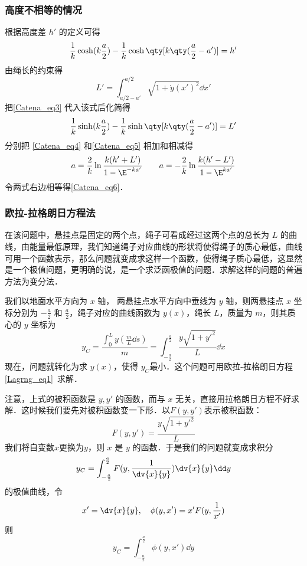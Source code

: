 \subsubsection{高度不相等的情况}
根据高度差 $h'$ 的定义可得
\begin{equation}\label{Catena_eq4}
\frac{1}{k}\cosh(k\frac{a}{2}) - \frac{1}{k}\cosh\qty[k\qty(\frac{a}{2}-a')] = h'
\end{equation}
由绳长的约束得
\begin{equation}
L' = \int_{a/2-a'}^{a/2} \sqrt{1 + \dot y(x')^2} \dd{x'}
\end{equation}
把\autoref{Catena_eq3} 代入该式后化简得
\begin{equation}\label{Catena_eq5}
\frac{1}{k}\sinh(k\frac{a}{2}) - \frac{1}{k}\sinh\qty[k\qty(\frac{a}{2}-a')] = L'
\end{equation}
分别把 \autoref{Catena_eq4} 和\autoref{Catena_eq5} 相加和相减得
\begin{equation}
a = \frac{2}{k} \ln\frac{k(h'+L')}{1 - \E^{-ka'}}
\qquad
a = -\frac{2}{k} \ln\frac{k(h'-L')}{1 - \E^{ka'}}
\end{equation}
令两式右边相等得\autoref{Catena_eq6}．

\subsubsection{欧拉-拉格朗日方程法}
在该问题中，悬挂点是固定的两个点，绳子可看成经过这两个点的总长为 $L$ 的曲线，由能量最低原理，我们知道绳子对应曲线的形状将使得绳子的质心最低，曲线可用一个函数表示，那么问题就变成求这样一个函数，使得绳子质心最低，这显然是一个极值问题，更明确的说，是一个求泛函极值的问题．求解这样的问题的普遍方法为变分法．

我们以地面水平方向为 $x$ 轴， 两悬挂点水平方向中垂线为 $y$ 轴，则两悬挂点 $x$ 坐标分别为 $-\frac{a}{2}$ 和 $\frac{a}{2}$，绳子对应的曲线函数为 $y(x)$，绳长 $L$，质量为 $m$，则其质心的 $y$ 坐标为
\begin{equation}
y_C=\frac{\int_{0}^{L}y(\frac{m}{L}\dd s)}{m}=\int_{-\frac{a}{2}}^{\frac{a}{2}} \frac{y\sqrt{1+y'^2}}{L}\dd x
\end{equation}
现在，问题就转化为求 $y(x)$，使得 $y_C$最小．这个问题可用欧拉-拉格朗日方程\autoref{Lagrng_eq1}~求解．

注意，上式的被积函数是 $y,y'$ 的函数，而与 $x$ 无关，直接用拉格朗日方程不好求解．这时候我们要先对被积函数变一下形．以$F(y,y')$表示被积函数： 
\begin{equation}\label{Catena_eq05}
F(y,y')=\frac{y\sqrt{1+y'^2}}{L}
\end{equation}
我们将自变数$x$更换为$y$，则 $x$ 是 $y$ 的函数．于是我们的问题就变成求积分
\begin{equation}
y_C=\int_{-\frac{a}{2}}^{\frac{a}{2}} F(y,\frac{1}{\dv {x}{y} })\dv{x}{y}\dd y
\end{equation}
的极值曲线，令 
\begin{equation}\label{Catena_eq9}
x'=\dv{x}{y},\quad \phi(y,x')=x'F(y,\frac{1}{x'})
\end{equation}
则
\begin{equation}
y_C=\int_{-\frac{a}{2}}^{\frac{a}{2}} \phi(y,x')\dd y
\end{equation}

